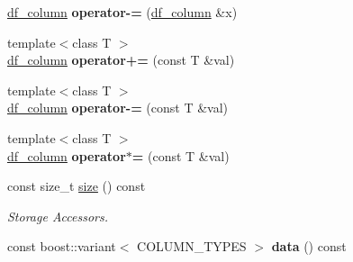 \begin{DoxyCompactItemize}
\item 
\hyperlink{classboost_1_1numeric_1_1ublas_1_1df__column}{df\+\_\+column} {\bfseries operator-\/=} (\hyperlink{classboost_1_1numeric_1_1ublas_1_1df__column}{df\+\_\+column} \&x)\hypertarget{classboost_1_1numeric_1_1ublas_1_1df__column_adfbc15a4704852ab8b8cafea6f331d36}{}\label{classboost_1_1numeric_1_1ublas_1_1df__column_adfbc15a4704852ab8b8cafea6f331d36}

\item 
{\footnotesize template$<$class T $>$ }\\\hyperlink{classboost_1_1numeric_1_1ublas_1_1df__column}{df\+\_\+column} {\bfseries operator+=} (const T \&val)\hypertarget{classboost_1_1numeric_1_1ublas_1_1df__column_ae0ea24e50a5b0bab6a1769843e4e8a31}{}\label{classboost_1_1numeric_1_1ublas_1_1df__column_ae0ea24e50a5b0bab6a1769843e4e8a31}

\item 
{\footnotesize template$<$class T $>$ }\\\hyperlink{classboost_1_1numeric_1_1ublas_1_1df__column}{df\+\_\+column} {\bfseries operator-\/=} (const T \&val)\hypertarget{classboost_1_1numeric_1_1ublas_1_1df__column_af1538077a1e758cd91af28532fba2e12}{}\label{classboost_1_1numeric_1_1ublas_1_1df__column_af1538077a1e758cd91af28532fba2e12}

\item 
{\footnotesize template$<$class T $>$ }\\\hyperlink{classboost_1_1numeric_1_1ublas_1_1df__column}{df\+\_\+column} {\bfseries operator$\ast$=} (const T \&val)\hypertarget{classboost_1_1numeric_1_1ublas_1_1df__column_a89a456bc73862053d18385ef49b9fd46}{}\label{classboost_1_1numeric_1_1ublas_1_1df__column_a89a456bc73862053d18385ef49b9fd46}

\item 
const size\+\_\+t \hyperlink{classboost_1_1numeric_1_1ublas_1_1df__column_ae604a0d9f7118a91615df1bcb4a7f823}{size} () const \hypertarget{classboost_1_1numeric_1_1ublas_1_1df__column_ae604a0d9f7118a91615df1bcb4a7f823}{}\label{classboost_1_1numeric_1_1ublas_1_1df__column_ae604a0d9f7118a91615df1bcb4a7f823}

\begin{DoxyCompactList}\small\item\em Storage Accessors. \end{DoxyCompactList}\item 
const boost\+::variant$<$ C\+O\+L\+U\+M\+N\+\_\+\+T\+Y\+P\+ES $>$ {\bfseries data} () const \hypertarget{classboost_1_1numeric_1_1ublas_1_1df__column_a4affb80868ab80aabf96f0be2fd613c7}{}\label{classboost_1_1numeric_1_1ublas_1_1df__column_a4affb80868ab80aabf96f0be2fd613c7}


\end{DoxyCompactItemize}
